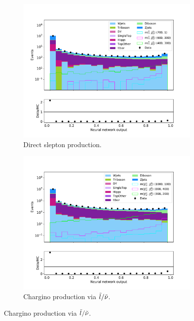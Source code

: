 \begin{figure}[H]
    \centering
    \begin{subfigure}[t!]{0.49\textwidth}
        \includegraphics[width = \textwidth]{Figures/Stacked/stackedplot_NN_All_level_slepslep.pdf}
        \caption{Direct slepton production.}
        \label{fig:SlepslepNNLow}
    \end{subfigure}
    \begin{subfigure}[t!]{0.49\textwidth}
        \includegraphics[width = \textwidth]{Figures/Stacked/stackedplot_NN_All_level_slepsnu.pdf}
        \caption{Chargino production via $\Tilde{l}/\Tilde{\nu}$.}

\end{subfigure}
\end{figure}
